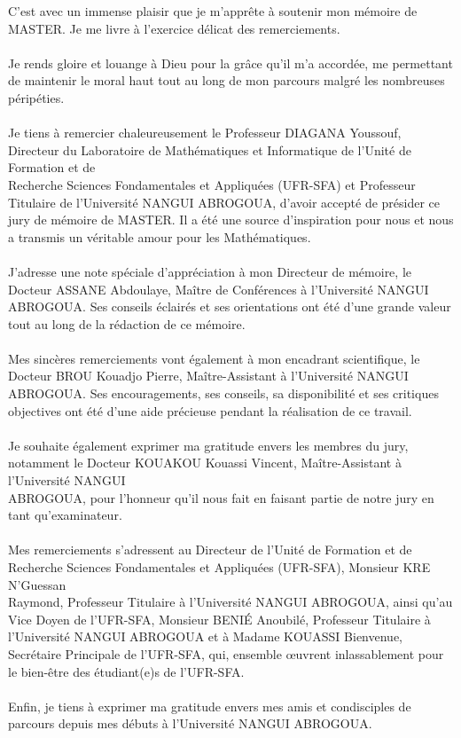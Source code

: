 C’est avec un immense plaisir que je m’apprête à soutenir mon mémoire de \\ MASTER. Je me livre à l’exercice délicat des remerciements.\\\\
Je rends gloire et louange à Dieu pour la grâce qu’il m’a accordée, me permettant de maintenir le moral haut tout au long de mon parcours malgré les nombreuses \\ péripéties.\\\\
Je tiens à remercier chaleureusement le Professeur DIAGANA Youssouf, Directeur du Laboratoire de Mathématiques et Informatique de l’Unité de Formation et de\\ Recherche Sciences Fondamentales et Appliquées (UFR-SFA) et Professeur Titulaire de l’Université NANGUI ABROGOUA, d’avoir accepté de présider ce jury de mémoire de MASTER. Il a été une source d’inspiration pour nous et nous a transmis un véritable amour pour les Mathématiques.\\\\
J’adresse une note spéciale d’appréciation à mon Directeur de mémoire, le Docteur ASSANE Abdoulaye, Maître de Conférences à l’Université NANGUI ABROGOUA. Ses conseils éclairés et ses orientations ont été d’une grande valeur tout au long de la rédaction de ce mémoire.\\\\
Mes sincères remerciements vont également à mon encadrant scientifique, le Docteur BROU Kouadjo Pierre, Maître-Assistant à l’Université NANGUI ABROGOUA. Ses encouragements, ses conseils, sa disponibilité et ses critiques objectives ont été d’une aide précieuse pendant la réalisation de ce travail.\\\\
Je souhaite également exprimer ma gratitude envers les membres du jury, notamment le Docteur KOUAKOU Kouassi Vincent, Maître-Assistant à l’Université NANGUI \\ ABROGOUA, pour l’honneur qu’il nous fait en faisant partie de notre jury en tant qu’examinateur.\\\\
Mes remerciements s’adressent au Directeur de l’Unité de Formation et de Recherche Sciences Fondamentales et Appliquées (UFR-SFA), Monsieur KRE N’Guessan \\ Raymond, Professeur Titulaire à l’Université NANGUI ABROGOUA, ainsi qu’au Vice Doyen de l’UFR-SFA, Monsieur BENIÉ Anoubilé, Professeur Titulaire à l’Université NANGUI ABROGOUA et à Madame KOUASSI Bienvenue, Secrétaire Principale de l’UFR-SFA, qui, ensemble œuvrent inlassablement pour le bien-être des étudiant(e)s de l’UFR-SFA.\\\\
Enfin, je tiens à exprimer ma gratitude envers mes amis et condisciples de parcours depuis mes débuts à l’Université NANGUI ABROGOUA.
